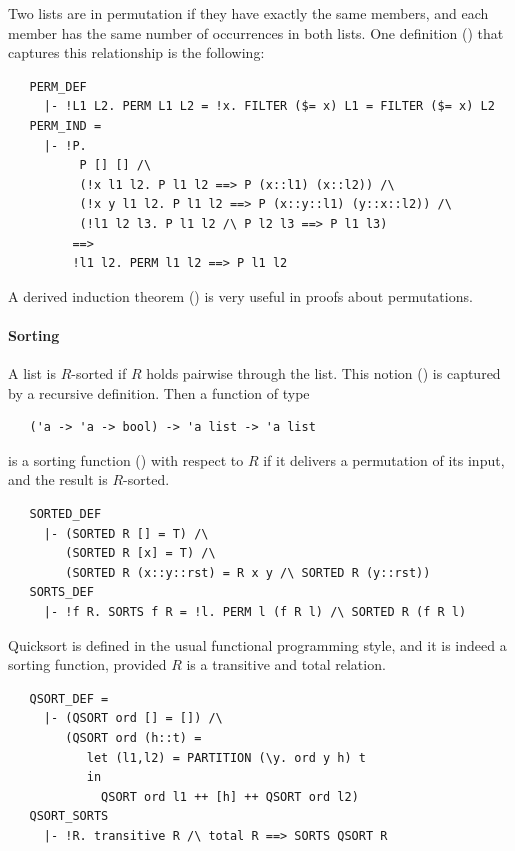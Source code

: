 {Two lists are in permutation if they have exactly the same members,
and each member has the same number of occurrences in both lists. One
definition () that captures this relationship is the
following:
%
\begin{hol}
\begin{verbatim}
   PERM_DEF
     |- !L1 L2. PERM L1 L2 = !x. FILTER ($= x) L1 = FILTER ($= x) L2
   PERM_IND =
     |- !P.
          P [] [] /\
          (!x l1 l2. P l1 l2 ==> P (x::l1) (x::l2)) /\
          (!x y l1 l2. P l1 l2 ==> P (x::y::l1) (y::x::l2)) /\
          (!l1 l2 l3. P l1 l2 /\ P l2 l3 ==> P l1 l3)
         ==>
         !l1 l2. PERM l1 l2 ==> P l1 l2
\end{verbatim}
\end{hol}
%
A derived induction theorem () is very
useful in proofs about permutations.

\paragraph{Sorting}

A list is $R$-sorted if $R$ holds pairwise through the list. This
notion () is captured by a recursive definition. Then
a function of type
%
\begin{hol}
\begin{verbatim}
   ('a -> 'a -> bool) -> 'a list -> 'a list
\end{verbatim}
\end{hol}
%
is a sorting function () with respect to $R$ if
it delivers a permutation of its input, and the result is $R$-sorted.
%
\begin{hol}
\begin{verbatim}
   SORTED_DEF
     |- (SORTED R [] = T) /\
        (SORTED R [x] = T) /\
        (SORTED R (x::y::rst) = R x y /\ SORTED R (y::rst))
   SORTS_DEF
     |- !f R. SORTS f R = !l. PERM l (f R l) /\ SORTED R (f R l)
\end{verbatim}
\end{hol}
%
Quicksort is defined in the usual functional programming style, and
it is indeed a sorting function, provided $R$ is a transitive and
total relation.
%
\begin{hol}
\begin{verbatim}
   QSORT_DEF =
     |- (QSORT ord [] = []) /\
        (QSORT ord (h::t) =
           let (l1,l2) = PARTITION (\y. ord y h) t
           in
             QSORT ord l1 ++ [h] ++ QSORT ord l2)
   QSORT_SORTS
     |- !R. transitive R /\ total R ==> SORTS QSORT R
\end{verbatim}
\end{hol}



}

